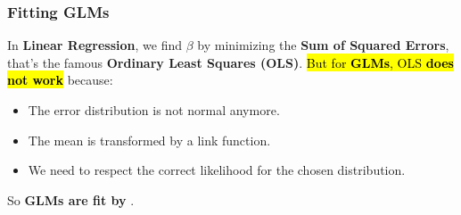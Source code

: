 \subsubsection{Fitting GLMs}

In \textbf{Linear Regression}, we find $\beta$ by minimizing the \textbf{Sum of Squared Errors}, that's the famous \textbf{Ordinary Least Squares (OLS)}. \hl{But for \textbf{GLMs}, OLS \textbf{does not work}} because:
\begin{itemize}
    \item The error distribution is not normal anymore.
    \item The mean is transformed by a link function.
    \item We need to respect the correct likelihood for the chosen distribution.
\end{itemize}
So \textbf{GLMs are fit by} .

